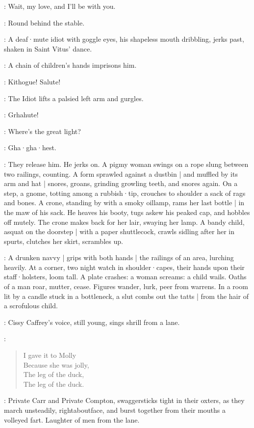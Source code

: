 \Calls:
Wait,
my love,
and I'll be with you.

\Answers:
Round behind the stable.

:
A deaf·mute idiot with goggle eyes,
his shapeless mouth dribbling,
jerks past,
shaken in Saint Vitus' dance.

:
A chain of children's hands imprisons him.

\Children:
Kithogue!
Salute!

:
The Idiot lifts a palsied left arm and gurgles.

\Idiot:
Grhahute!%

\Children:
Where's the great light?

\Idiot:
 Gha·gha·hest.

:
They release him.
He jerks on.
A pigmy woman swings on a rope slung between two railings,
counting.
A form sprawled against a dustbin |
and muffled by its arm and hat |
snores,
groans,
grinding growling teeth,
and snores again.
On a step,
a gnome,
totting among a rubbish·tip,
crouches to shoulder a sack of rags and bones.
A crone,
standing by with a smoky oillamp,
rams her last bottle |
in the maw of his sack.
He heaves his booty,
tugs askew his peaked cap,
and hobbles off mutely.
The crone makes back for her lair,
swaying her lamp.
A bandy child,
asquat on the doorstep |
with a paper shuttlecock,
crawls sidling after her in spurts,
clutches her skirt,
scrambles up.

:
A drunken navvy |
grips with both hands |
the railings of an area,
lurching heavily.
At a corner,
two night watch in shoulder·capes,
their hands upon their staff·holsters,
loom tall.
A plate crashes:
a woman screams:
a child wails.
Oaths of a man roar,
mutter,
cease.
Figures wander,
lurk,
peer from warrens.
In a room lit by a candle stuck in a bottleneck,
a slut combs out the tatts |
from the hair of a scrofulous child.

:
Cissy Caffrey's voice,
still young,
sings shrill from a lane.

\Cissy:
\begin{verse}
    I gave it to Molly\\
    Because she was jolly,\\
    The leg of the duck,\\
    The leg of the duck.
\end{verse}

:
Private Carr and Private Compton,
swaggersticks tight in their oxters,
as they march unsteadily,
rightaboutface,
and
burst together from their mouths a volleyed fart.
Laughter of men from the lane.

